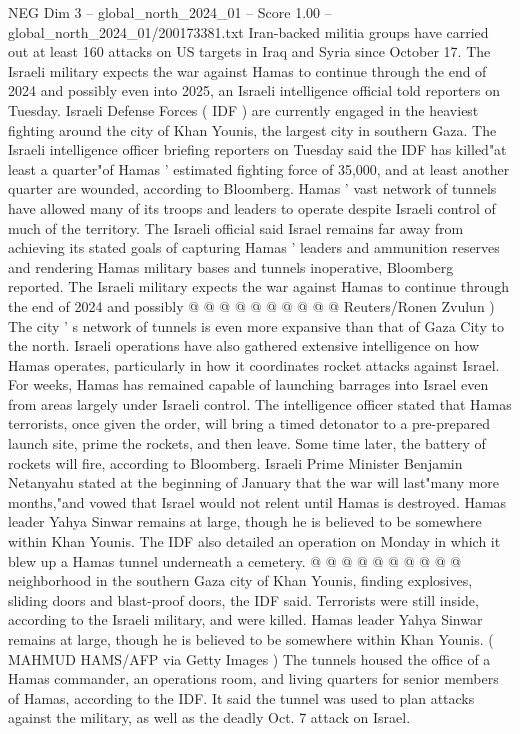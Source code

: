 \begin{textsample}{NEG Dim 3 – global\_north\_2024\_01 – Score 1.00 – global\_north\_2024\_01/200173381.txt}  \label{ex:f3_neg_240}
Iran-backed militia groups have carried out at least 160 attacks on US targets in Iraq and Syria since October 17.
The Israeli military expects the war against Hamas to continue through the end of 2024 and possibly even into 2025, an Israeli intelligence official told reporters on Tuesday.
Israeli Defense Forces ( IDF ) are currently engaged in the heaviest fighting around the city of Khan Younis, the largest city in southern Gaza.
The Israeli intelligence officer briefing reporters on Tuesday said the IDF has killed"at least a quarter"of Hamas ' estimated fighting force of 35,000, and at least another quarter are wounded, according to Bloomberg.
Hamas ' vast network of tunnels have allowed many of its troops and leaders to operate despite Israeli control of much of the territory.
The Israeli official said Israel remains far away from achieving its stated goals of capturing Hamas ' leaders and ammunition reserves and rendering Hamas military bases and tunnels inoperative, Bloomberg reported.
The Israeli military expects the war against Hamas to continue through the end of 2024 and possibly @ @ @ @ @ @ @ @ @ @ Reuters/Ronen Zvulun ) The city ' s network of tunnels is even more expansive than that of Gaza City to the north.
Israeli operations have also gathered extensive intelligence on how Hamas operates, particularly in how it coordinates rocket attacks against Israel.
For weeks, Hamas has remained capable of launching barrages into Israel even from areas largely under Israeli control.
The intelligence officer stated that Hamas terrorists, once given the order, will bring a timed detonator to a pre-prepared launch site, prime the rockets, and then leave.
Some time later, the battery of rockets will fire, according to Bloomberg.
Israeli Prime Minister Benjamin Netanyahu stated at the beginning of January that the war will last"many more months,"and vowed that Israel would not relent until Hamas is destroyed.
Hamas leader Yahya Sinwar remains at large, though he is believed to be somewhere within Khan Younis.
The IDF also detailed an operation on Monday in which it blew up a Hamas tunnel underneath a cemetery. @ @ @ @ @ @ @ @ @ @ neighborhood in the southern Gaza city of Khan Younis, finding explosives, sliding doors and blast-proof doors, the IDF said.
Terrorists were still inside, according to the Israeli military, and were killed.
Hamas leader Yahya Sinwar remains at large, though he is believed to be somewhere within Khan Younis. ( MAHMUD HAMS/AFP via Getty Images ) The tunnels housed the office of a Hamas commander, an operations room, and living quarters for senior members of Hamas, according to the IDF.
It said the tunnel was used to plan attacks against the military, as well as the deadly Oct. 7 attack on Israel.

\end{textsample}
